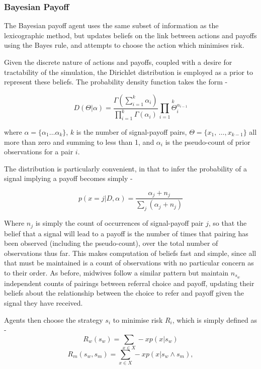 \subsubsection{Bayesian Payoff}

The Bayesian payoff agent uses the same subset of information as the lexicographic method, but updates beliefs on the link between actions and payoffs using the Bayes rule, and attempts to choose the action which minimises risk.

Given the discrete nature of actions and payoffs, coupled with a desire for tractability of the
simulation, the Dirichlet distribution is employed as a prior to represent these beliefs. The probability
density function takes the form -

\begin{equation}
D(\Theta|\alpha)=\frac{\Gamma(\sum_{i=1}^{k}\alpha_{i})}{\prod_{i=1}^{k}\Gamma(\alpha_{i})}\overset{k}{\underset{i=1}{\prod}\Theta_{i}^{\alpha_{i-1}}}
\end{equation}


where \(\alpha=\{\alpha_{1}\ldots\alpha_{k}\}\), \(k\) is the number
of signal-payoff pairs, \(\Theta=\{x_{1},\,\ldots,x_{k-\text{1}}\}\) all
more than zero and summing to less than 1, and \(\alpha_{i}\) is the 
pseudo-count of prior observations for a pair \(i\). 

The distribution is particularly convenient, in that to infer the
probability of a signal implying a payoff becomes
simply -

\begin{equation}
p(x=j|D,\alpha)=\frac{\alpha_{j}+n_{j}}{\sum_{j}(\alpha_{j}+n_{j})}\label{eq:posterior}
\end{equation}


Where \(n_{j}\) is simply the count of occurrences of signal-payoff pair \(j\), so
that the belief that a signal will lead to a payoff is the number
of times that pairing has been observed (including the pseudo-count),
over the total number of observations thus far. This makes computation
of beliefs fast and simple, since all that must be maintained is
a count of observations with no particular concern as to their order.
As before, midwives follow a similar pattern but maintain \(n_{s_{w}}\) independent counts of pairings between referral choice and payoff, updating their beliefs about the relationship between the choice to refer and payoff given the signal they have received.

Agents then choose the strategy $s_{i}$ to minimise risk $R_{i}$, which is simply defined as - 
\begin{equation}
R_{w}(s_{w}) = \sum_{x \in X} -xp(x | s_{w})
\end{equation}
\begin{equation}
R_{m}(s_{w}, s_{m}) = \sum_{x \in X} -xp(x | s_{w}\wedge s_{m}),
\end{equation}

